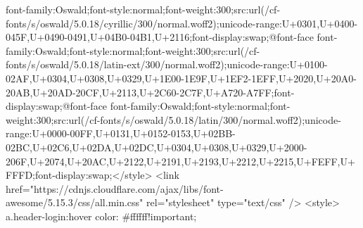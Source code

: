 {font-family:Oswald;font-style:normal;font-weight:300;src:url(/cf-fonts/s/oswald/5.0.18/cyrillic/300/normal.woff2);unicode-range:U+0301,U+0400-045F,U+0490-0491,U+04B0-04B1,U+2116;font-display:swap;}@font-face {font-family:Oswald;font-style:normal;font-weight:300;src:url(/cf-fonts/s/oswald/5.0.18/latin-ext/300/normal.woff2);unicode-range:U+0100-02AF,U+0304,U+0308,U+0329,U+1E00-1E9F,U+1EF2-1EFF,U+2020,U+20A0-20AB,U+20AD-20CF,U+2113,U+2C60-2C7F,U+A720-A7FF;font-display:swap;}@font-face {font-family:Oswald;font-style:normal;font-weight:300;src:url(/cf-fonts/s/oswald/5.0.18/latin/300/normal.woff2);unicode-range:U+0000-00FF,U+0131,U+0152-0153,U+02BB-02BC,U+02C6,U+02DA,U+02DC,U+0304,U+0308,U+0329,U+2000-206F,U+2074,U+20AC,U+2122,U+2191,U+2193,U+2212,U+2215,U+FEFF,U+FFFD;font-display:swap;}</style>
<link href="https://cdnjs.cloudflare.com/ajax/libs/font-awesome/5.15.3/css/all.min.css" rel="stylesheet" type="text/css" />
<style>
        a.header-login:hover{
            color: #ffffff!important;
        }


